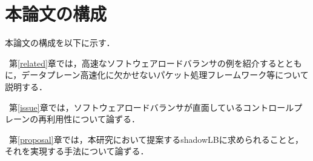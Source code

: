 






\section{本論文の構成}

本論文の構成を以下に示す．

~第\ref{related}章では，高速なソフトウェアロードバランサの例を紹介するとともに，データプレーン高速化に欠かせないパケット処理フレームワーク等について説明する．

~第\ref{issue}章では，ソフトウェアロードバランサが直面しているコントロールプレーンの再利用性について論ずる．


~第\ref{proposal}章では，本研究において提案するshadowLBに求められることと，それを実現する手法について論ずる．

